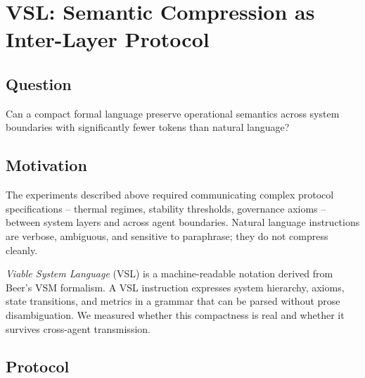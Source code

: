 %
%

\section{VSL: Semantic Compression as Inter-Layer Protocol}
\label{sec:vsl}

\subsection*{Question}
Can a compact formal language preserve operational semantics across system
boundaries with significantly fewer tokens than natural language?

\subsection{Motivation}

The experiments described above required communicating complex protocol
specifications -- thermal regimes, stability thresholds, governance axioms --
between system layers and across agent boundaries.
Natural language instructions are verbose, ambiguous, and sensitive to
paraphrase; they do not compress cleanly.

\emph{Viable System Language} (VSL) is a machine-readable notation derived
from Beer's VSM formalism.
A VSL instruction expresses system hierarchy, axioms, state transitions,
and metrics in a grammar that can be parsed without prose disambiguation.
We measured whether this compactness is real and whether it survives
cross-agent transmission.

\subsection{Protocol}

